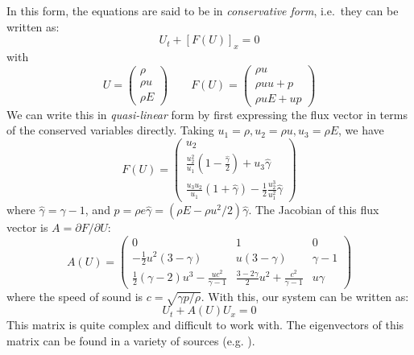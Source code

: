 In this form, the equations are said to be in {\em conservative form},
i.e.\ they can be written as:
\begin{equation}
U_t + \left [F(U) \right ]_x = 0
\end{equation}
with
\begin{equation}
U = \left ( \begin{array}{c} \rho \\ \rho u \\ \rho E \end{array} \right )
%
\qquad
%
F(U) = \left ( \begin{array}{c} \rho u \\ \rho uu + p \\ \rho u E + up \end{array} \right )
\end{equation}
%
We can write this in {\em quasi-linear} form by first expressing the flux
vector in terms of the conserved variables directly.  Taking $u_1 =
\rho, u_2 = \rho u, u_3 = \rho E$, we have
\begin{equation}
F(U) = \left ( \begin{array}{c} 
      u_2 \\
      \frac{u_2^2}{u_1} \left (1 - \frac{\hat{\gamma}}{2} \right ) + u_3 \hat{\gamma} \\
      \frac{u_3 u_2}{u_1}(1 + \hat{\gamma}) - \frac{1}{2} \frac{u_2^3}{u_1^2} \hat{\gamma} \end{array} \right )
\end{equation}
where $\hat{\gamma} = \gamma - 1$, and $p = \rho e \hat{\gamma} = (\rho E - \rho u^2/2)\hat{\gamma}$.  The Jacobian of this flux vector is $A = \partial F/\partial U$:
\begin{equation}
A(U) = \left ( \begin{array}{ccc} 
   0  & 1 & 0 \\
   -\frac{1}{2}u^2(3 -\gamma) & u (3 -\gamma) & \gamma - 1 \\
   \frac{1}{2}(\gamma -2)u^3 - \frac{uc^2}{\gamma -1} &
       \frac{3-2\gamma}{2} u^2 + \frac{c^2}{\gamma -1} & u \gamma
  \end{array} \right )
\end{equation}
where the speed of sound is $c = \sqrt{\gamma p/\rho}$.   With this, our
system can be written as:
\begin{equation}
U_t + A(U) U_x = 0
\end{equation}
This matrix is quite complex and difficult to work with.  The
eigenvectors of this matrix can be found in a variety of sources
(e.g. \cite{toro:1997,athena}).


